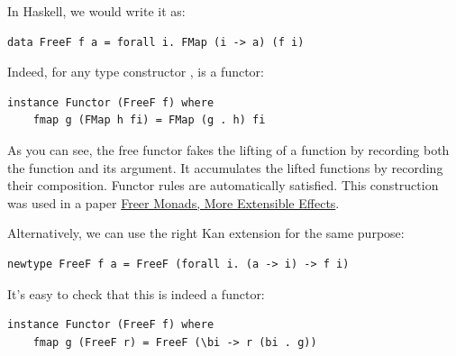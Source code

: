 In Haskell, we would write it as:

\begin{verbatim}
data FreeF f a = forall i. FMap (i -> a) (f i)
\end{verbatim}
Indeed, for any type constructor ,  is a
functor:

\begin{verbatim}
instance Functor (FreeF f) where
    fmap g (FMap h fi) = FMap (g . h) fi
\end{verbatim}
As you can see, the free functor fakes the lifting of a function by
recording both the function and its argument. It accumulates the lifted
functions by recording their composition. Functor rules are
automatically satisfied. This construction was used in a paper
\href{http://okmij.org/ftp/Haskell/extensible/more.pdf}{Freer Monads,
More Extensible Effects}.

Alternatively, we can use the right Kan extension for the same purpose:

\begin{verbatim}
newtype FreeF f a = FreeF (forall i. (a -> i) -> f i)
\end{verbatim}
It's easy to check that this is indeed a functor:

\begin{verbatim}
instance Functor (FreeF f) where
    fmap g (FreeF r) = FreeF (\bi -> r (bi . g))
\end{verbatim}
